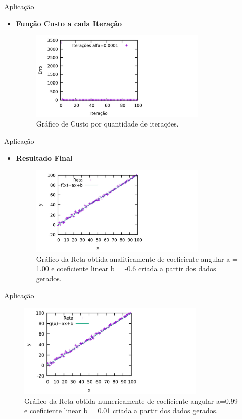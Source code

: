 \documentclass{beamer}
\begin{document}
  \begin{frame}{Aplicação}
  \begin{itemize}
  \item \textbf{Função Custo a cada Iteração}
  \begin{figure}
  \centering
  \includegraphics[width=0.8\textwidth]{custo_iteration.jpg}
  \caption{Gráfico de Custo por quantidade de iterações.}
  \end{figure}
  \end{itemize}
  \end{frame}
  
  \begin{frame}{Aplicação}
  \begin{itemize}
  \item \textbf{Resultado Final}
  \begin{figure}
  \centering
  \includegraphics[width=0.8\textwidth]{reta_f_x_.jpg}
  \caption{Gráfico da Reta obtida analiticamente de coeficiente angular a = 1.00 e coeficiente linear b = -0.6 criada a partir dos dados gerados.}
  \end{figure}
  \end{itemize}  
  \end{frame}
  
    \begin{frame}{Aplicação}
  \begin{figure}
  \centering
  \includegraphics[width=0.8\textwidth]{reta_g_x_.jpg}
  \caption{Gráfico da Reta obtida numericamente de coeficiente angular a=0.99 e coeficiente linear b = 0.01 criada a partir dos dados gerados.}
  \end{figure}
  \end{frame}
  
\end{document}
